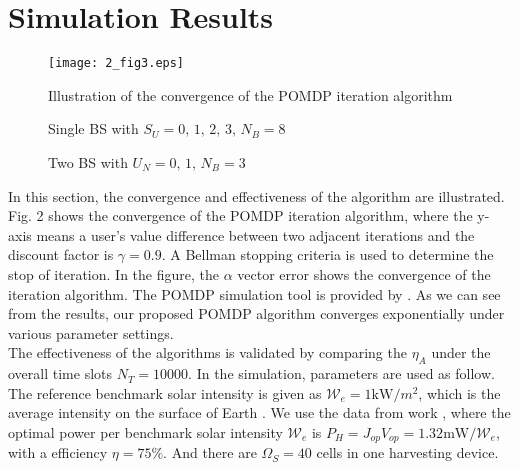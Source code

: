 \documentclass[journal,12pt,draftclsnofoot,onecolumn]{IEEEtran}
\begin{document}
\section{Simulation Results}
\begin{figure}
\centering
\texttt{[image: 2\_fig3.eps]}
\caption{Illustration of the convergence of the POMDP iteration algorithm}
\end{figure}
\begin{figure}[t]
\centering
{}
\caption{Single BS with \(S_U = 0,\,1,\,2,\,3,\, N_B = 8\)}
\end{figure}
\begin{figure}[t]
\centering
{}
\caption{Two BS with \(U_N = 0,\,1,\, N_B = 3\)}
\end{figure}
In this section, the convergence and effectiveness of the algorithm are illustrated.
Fig. 2 shows the convergence of the POMDP iteration algorithm, where the y-axis means a user's value difference between two adjacent iterations and the discount factor is \(\gamma = 0.9\).
A Bellman stopping criteria is used to determine the stop of iteration.
In the figure, the \(\alpha\) vector error shows the convergence of the iteration algorithm.
The POMDP simulation tool is provided by \cite{pomdptool}.
As we can see from the results, our proposed POMDP algorithm converges exponentially under various parameter settings.\\
\indent The effectiveness of the algorithms is validated by comparing the \(\eta_A\)
under the overall time slots \(N_T = 10000\).
In the simulation, parameters are used as follow.
The reference benchmark solar intensity is given as \(\mathcal{W}_e = 1\mbox{kW}/m^2\),
which is the average intensity on the surface of Earth \cite{electric}.
We use the data from work \cite{circuit}, where the optimal power per benchmark solar intensity \(\mathcal{W}_e\)
is \(P_H = J_{op}V_{op} = 1.32\mbox{mW}/\mathcal{W}_e\), with a efficiency \(\eta = 75 \%\).
And there are \(\Omega_S = 40\) cells in one harvesting device.
\end{document}
